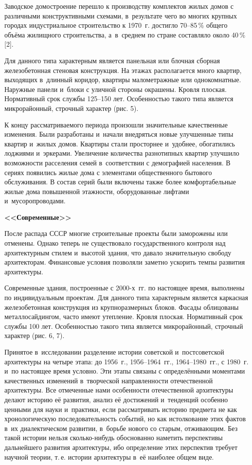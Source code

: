 Заводское домостроение перешло к производству комплектов жилых домов с различными конструктивными схемами, в~результате чего во многих крупных городах индустриальное строительство к 1970~г. достигло 70--85\,\% общего объёма жилищного строительства, а~в~среднем по стране составляло около 40\,\% [2].

Для данного типа характерным является панельная или блочная сборная железобетонная стеновая конструкция. На этажах располагается много квартир, выходящих в~длинный коридор, квартиры малометражные или однокомнатные. Наружные панели и~блоки с уличной стороны окрашены. Кровля плоская. Нормативный срок службы 125--150 лет. Особенностью такого типа является микрорайонный, строчный характер (рис. 5).



К концу рассматриваемого периода произошли значительные качественные изменения. Были разработаны и~начали внедряться новые улучшенные типы квартир и~жилых домов. Квартиры стали просторнее и~удобнее, обогатились лоджиями и~эркерами. Увеличение количества разнотипных квартир улучшило возможности расселения семей в~соответствии с демографией населения. В сериях появились жилые дома с элементами общественного бытового обслуживания. В состав серий были включены также более комфортабельные жилые дома повышенной этажности, оборудованные лифтами и~мусоропроводами.

\textbf{<<Современные>>}

После распада СССР многие строительные проекты были заморожены или отменены. Однако теперь не существовало государственного контроля над архитектурным стилем и~высотой здания, что давало значительную свободу архитекторам. Финансовые условия позволяли заметно ускорить темпы развития архитектуры.

Современные здания, построенные с 2000-х~гг. по настоящее время, выполнены по индивидуальным проектам. Для данного типа характерным является каркасная железобетонная конструкция из крупноразмерных блоков. Фасады облицованы металлосайдингом, часто имеют утепление. Кровля плоская. Нормативный срок службы 100 лет. Особенностью такого типа является микрорайонный, строчный характер (рис. 6, 7).


\vspace{-12pt}
Принятое в~исследовании разделение истории советской и~постсоветской архитектуры на четыре этапа: до 1956~г., 1956--1964~гг., 1964--1980~гг., с 1980~г. и~по настоящее время условно. Эти этапы связаны с определёнными моментами качественных изменений в~творческой направленности отечественной архитектуры. Все отмеченные нами особенности отечественной архитектуры делают историю её развития, анализ её достижений и~тенденций особенно ценными для науки и~практики, если рассматривать историю предмета не как хронологическую последовательность событий, но как истолкование этих фактов в~их диалектическом развитии, в~борьбе нового со старым, отживающим. Без такой истории нельзя сколько-нибудь обоснованно наметить перспективы дальнейшего развития архитектуры, ибо определение этих перспектив требует научной теории, т.\,е. истории архитектуры в~её наиболее общем виде.

